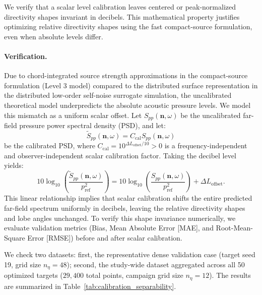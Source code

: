 \documentclass[11pt]{article}
\newcommand{\vect}[1]{\bm{#1}}
\begin{document}
We verify that a scalar level calibration leaves centered or peak-normalized directivity shapes invariant in decibels. This mathematical property justifies optimizing relative directivity shapes using the fast compact-source formulation, even when absolute levels differ.

\paragraph{Verification.}
Due to chord-integrated source strength approximations in the compact-source formulation (Level 3 model) compared to the distributed surface representation in the distributed low-order self-noise surrogate simulation, the uncalibrated theoretical model underpredicts the absolute acoustic pressure levels. We model this mismatch as a uniform scalar offset. Let $S_{pp}(\vect{n},\omega)$ be the uncalibrated far-field pressure power spectral density (PSD), and let:
\begin{equation*}
    \tilde{S}_{pp}(\vect{n},\omega) = C_{\mathrm{cal}} S_{pp}(\vect{n},\omega)
\end{equation*}
be the calibrated PSD, where $C_{\mathrm{cal}} = 10^{\Delta L_{\mathrm{offset}} / 10} > 0$ is a frequency-independent and observer-independent scalar calibration factor. Taking the decibel level yields:
\begin{equation*}
    10 \log_{10} \left( \frac{\tilde{S}_{pp}(\vect{n},\omega)}{p_{\mathrm{ref}}^2} \right) = 10 \log_{10} \left( \frac{S_{pp}(\vect{n},\omega)}{p_{\mathrm{ref}}^2} \right) + \Delta L_{\mathrm{offset}}.
\end{equation*}
This linear relationship implies that scalar calibration shifts the entire predicted far-field spectrum uniformly in decibels, leaving the relative directivity shapes and lobe angles unchanged. To verify this shape invariance numerically, we evaluate validation metrics (Bias, Mean Absolute Error [MAE], and Root-Mean-Square Error [RMSE]) before and after scalar calibration.

We check two datasets: first, the representative dense validation case (target seed 19, grid size $n_\eta = 48$); second, the study-wide dataset aggregated across all 50 optimized targets ($29{,}400$ total points, campaign grid size $n_\eta = 12$). The results are summarized in Table~\ref{tab:calibration_separability}.
\end{document}
